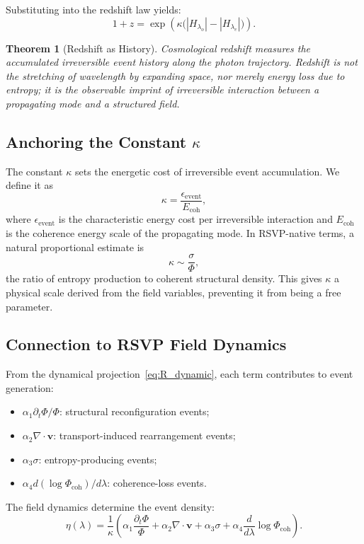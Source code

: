 \documentclass[12pt,a4paper]{article}
\newtheorem{theorem}{Theorem}[section]
\theoremstyle{remark}
\newcommand{\vv}{\mathbf{v}}
\begin{document}
Substituting into the redshift law yields:
\begin{equation}
\boxed{1 + z = \exp\!\left(\kappa\bigl(|H_{\lambda_o}| - |H_{\lambda_e}|\bigr)\right).}
\label{eq:z_spherepop}
\end{equation}

\begin{theorem}[Redshift as History]
Cosmological redshift measures the accumulated irreversible event history along the photon trajectory. Redshift is not the stretching of wavelength by expanding space, nor merely energy loss due to entropy; it is the observable imprint of irreversible interaction between a propagating mode and a structured field.
\end{theorem}

\subsection{Anchoring the Constant $\kappa$}

The constant $\kappa$ sets the energetic cost of irreversible event accumulation. We define it as
\begin{equation}
\kappa = \frac{\epsilon_{\mathrm{event}}}{E_{\mathrm{coh}}},
\end{equation}
where $\epsilon_{\mathrm{event}}$ is the characteristic energy cost per irreversible interaction and $E_{\mathrm{coh}}$ is the coherence energy scale of the propagating mode. In RSVP-native terms, a natural proportional estimate is
\begin{equation}
\kappa \sim \frac{\sigma}{\Phi},
\end{equation}
the ratio of entropy production to coherent structural density. This gives $\kappa$ a physical scale derived from the field variables, preventing it from being a free parameter.

\subsection{Connection to RSVP Field Dynamics}

From the dynamical projection~\eqref{eq:R_dynamic}, each term contributes to event generation:
\begin{itemize}[leftmargin=2em]
\item $\alpha_1 \partial_t\Phi/\Phi$: structural reconfiguration events;
\item $\alpha_2 \nabla\cdot\vv$: transport-induced rearrangement events;
\item $\alpha_3\sigma$: entropy-producing events;
\item $\alpha_4 d(\log\Phi_{\mathrm{coh}})/d\lambda$: coherence-loss events.
\end{itemize}
The field dynamics determine the event density:
\begin{equation}
\eta(\lambda) = \frac{1}{\kappa}\left(\alpha_1\frac{\partial_t\Phi}{\Phi} + \alpha_2\nabla\cdot\vv + \alpha_3\sigma + \alpha_4\frac{d}{d\lambda}\log\Phi_{\mathrm{coh}}\right).
\end{equation}
\end{document}
